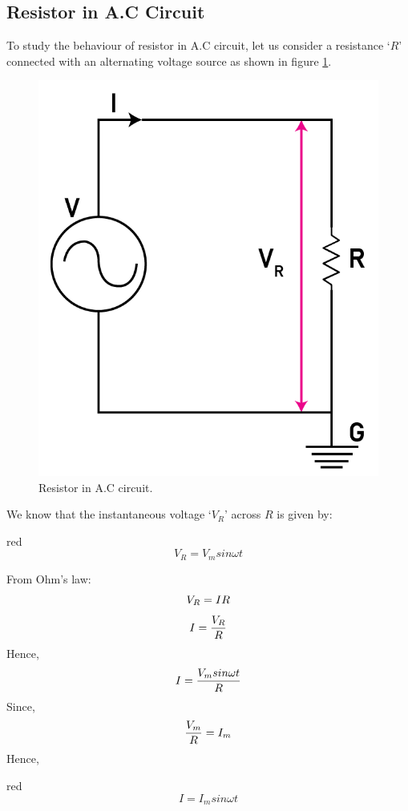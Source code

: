 \subsection{Resistor in A.C Circuit}
To study the behaviour of resistor in A.C circuit, let us consider a
resistance ‘$R$’ connected with an alternating voltage source as shown in
figure \ref{fig:15.7}.
\begin{figure}[H]
    \centering
    \includegraphics[scale = 0.9]{Images/Chapter-15/15.7}
    \caption{Resistor in A.C circuit.}
    \label{fig:15.7}
\end{figure}
\noindent We know that the instantaneous voltage ‘$V_{R}$’ across $R$ is
given by:
\begin{mybox}{red}{}
\begin{equation}\label{eq:15.11}
    V_{R} = V_{m} sin \omega t
\end{equation}
\end{mybox}
\noindent From Ohm’s law:
\begin{equation}\notag
    V_{R} = IR
\end{equation}
\begin{equation}\notag
    I= \frac{V_{R}}{R}
\end{equation}
Hence,
\begin{equation}\notag
    I = \frac{V_{m} sin \omega t}{R}
\end{equation}
Since,
\begin{equation}\notag
    \frac{V_{m}}{R} = I_{m}
\end{equation}
Hence,
\begin{mybox}{red}{}
\begin{equation}\label{eq:15.12}
    I = I_{m} sin \omega t
\end{equation}
\end{mybox}
